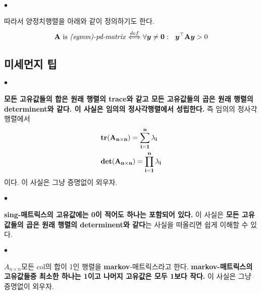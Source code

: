\documentclass[12pt,oneside,english,a4paper]{article}
\def\ck{\paragraph{\Large$\bullet$}\Large}
\newcommand{\bfA}{\mbox{$\bf{A}$}}
\begin{document}
\ck 따라서 양정치행렬을 아래와 같이 정의하기도 한다. 
\begin{align*}
\mbox{$\bfA$ is \emph{(symm)-pd-matrix}} \overset{def}{\Longleftrightarrow} \forall {\boldsymbol y}\neq {\boldsymbol 0}: ~~ {\boldsymbol y}^\top{\bf A}{\boldsymbol y}>0
\end{align*}

\subsection{미세먼지 팁}
\ck \textbf{모든 고유값들의 합은 원래 행렬의 trace와 같고 모든 고유값들의 곱은 원래 행렬의 determinent와 같다. 이 사실은 임의의 정사각행렬에서 성립한다.} 즉 임의의 정사각행렬에서 
\begin{align*}
& \bf{tr}({\bf A}_ {n \times n})=\sum_{i=1}^{n} \lambda_i \\ 
& \bf{det}({\bf A}_ {n \times n})=\prod_{i=1}^{n}\lambda_i
\end{align*}
이다. 이 사실은 그냥 증명없이 외우자. 

\ck \textbf{sing-매트릭스의 고유값에는 0이 적어도 하나는 포함되어 있다.} 이 사실은 \textbf{모든 고유값들의 곱은 원래 행렬의 determinent와 같다}는 사실을 떠올리면 쉽게 이해할 수 있다. 

\ck $A_{n \times n}$모든 col의 합이 1인 행렬을 \textbf{markov}-매트릭스라고 한다. \textbf{markov-매트릭스의 고유값들중 최소한 하나는 1이고 나머지 고유값은 모두 1보다 작다.} 이 사실은 그냥 증명없이 외우자. 
\end{document}
